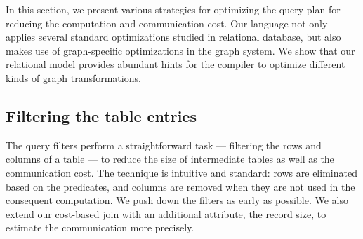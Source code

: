 \documentclass{sokendai_thesis} %
\begin{document}
In this section, we present various strategies for optimizing the query plan for reducing the computation and communication cost.
Our language not only applies several standard optimizations studied in relational database, but also makes use of graph-specific optimizations in the graph system.
We show that our relational model provides abundant hints for the compiler to optimize different kinds of graph transformations.

\subsection{Filtering the table entries}
\label{sec:filtering}

The query filters perform a straightforward task --- filtering the rows and columns of a table --- to reduce the size of intermediate tables as well as the communication cost.
The technique is intuitive and standard: rows are eliminated based on the predicates, and columns are removed when they are not used in the consequent computation.
We push down the filters as early as possible.
We also extend our cost-based join with an additional attribute, the record size, to estimate the communication more precisely.

\end{document}
